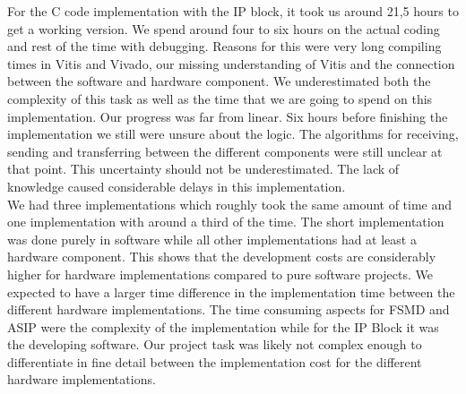 \documentclass[conference]{IEEEtran}
\begin{document}
For the C code implementation with the IP block, it took us around 21,5 hours to get a working version. We spend around four to six hours on the actual coding and rest of the time with debugging. Reasons for this were very long compiling times in Vitis and Vivado, our missing understanding of Vitis and the connection between the software and hardware component. We underestimated both the complexity of this task as well as the time that we are going to spend on this implementation. Our progress was far from linear. Six hours before finishing the implementation we still were unsure about the logic. The algorithms for receiving, sending and transferring between the different components were still unclear at that point. This uncertainty should not be underestimated. The lack of knowledge caused considerable delays in this implementation. \\
We had three implementations which roughly took the same amount of time and one implementation with around a third of the time. The short implementation was done purely in software while all other implementations had at least a hardware component. This shows that the development costs are considerably higher for hardware implementations compared to pure software projects. We expected to have a larger time difference in the implementation time between the different hardware implementations. The time consuming aspects for FSMD and ASIP were the complexity of the implementation while for the IP Block it was the developing software. Our project task was likely not complex enough to differentiate in fine detail between the implementation cost for the different hardware implementations.\\
\end{document}
